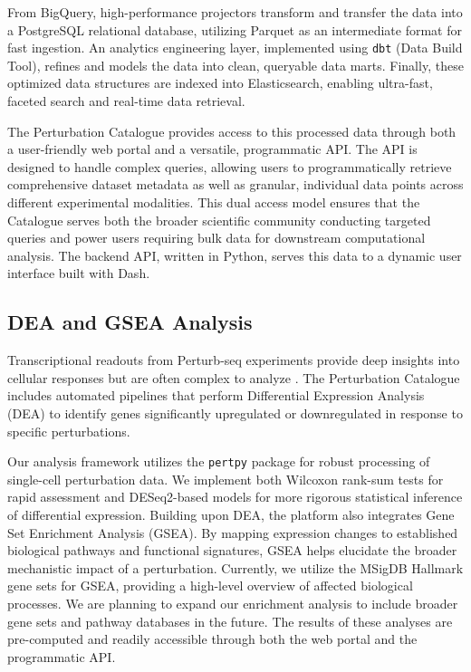 \documentclass[unnumsec,webpdf,contemporary,large]{oup-authoring-template}
\begin{document}
From BigQuery, high-performance projectors transform and transfer the data into a PostgreSQL relational database, utilizing Parquet as an intermediate format for fast ingestion. An analytics engineering layer, implemented using \texttt{dbt} (Data Build Tool), refines and models the data into clean, queryable data marts. Finally, these optimized data structures are indexed into Elasticsearch, enabling ultra-fast, faceted search and real-time data retrieval. 

The Perturbation Catalogue provides access to this processed data through both a user-friendly web portal and a versatile, programmatic API. The API is designed to handle complex queries, allowing users to programmatically retrieve comprehensive dataset metadata as well as granular, individual data points across different experimental modalities. This dual access model ensures that the Catalogue serves both the broader scientific community conducting targeted queries and power users requiring bulk data for downstream computational analysis. The backend API, written in Python, serves this data to a dynamic user interface built with Dash.

\subsection{DEA and GSEA Analysis}
Transcriptional readouts from Perturb-seq experiments provide deep insights into cellular responses but are often complex to analyze \citep{norman2019exploring}. The Perturbation Catalogue includes automated pipelines that perform Differential Expression Analysis (DEA) to identify genes significantly upregulated or downregulated in response to specific perturbations. 

Our analysis framework utilizes the \texttt{pertpy} package \citep{pertpy} for robust processing of single-cell perturbation data. We implement both Wilcoxon rank-sum tests for rapid assessment and DESeq2-based models for more rigorous statistical inference of differential expression. Building upon DEA, the platform also integrates Gene Set Enrichment Analysis (GSEA). By mapping expression changes to established biological pathways and functional signatures, GSEA helps elucidate the broader mechanistic impact of a perturbation. Currently, we utilize the MSigDB Hallmark gene sets for GSEA, providing a high-level overview of affected biological processes. We are planning to expand our enrichment analysis to include broader gene sets and pathway databases in the future. The results of these analyses are pre-computed and readily accessible through both the web portal and the programmatic API.
\end{document}
